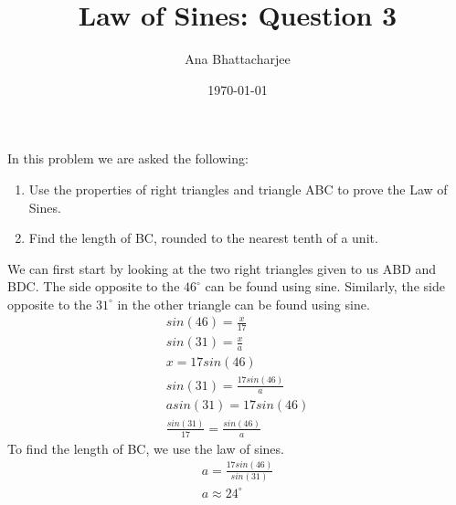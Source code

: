\documentclass{article}
\begin{document}
\author{Ana Bhattacharjee}
\title{Law of Sines: Question 3}
\date{\today}

\begin{center}
In this problem we are asked the following:
\begin{enumerate}
  \item Use the properties of right triangles and triangle ABC to prove the Law of Sines.
  \item Find the length of BC, rounded to the nearest tenth of a unit.
\end{enumerate}
\par
We can first start by looking at the two right triangles given to us ABD and BDC. The side opposite to the $46^{\circ}$ can be found using sine. Similarly, the side opposite to the $31^{\circ}$ in the other triangle can be found using sine.
\begin{align}
sin(46) = \frac{x}{17} \\
sin(31) = \frac{x}{a} \\
x = 17 sin(46) \\
sin(31) = \frac{17 sin(46)}{a} \\
a sin(31) = 17 sin(46) \\
\frac{sin(31)}{17} = \frac{sin(46)}{a}
\end{align}
To find the length of BC, we use the law of sines.
\begin{align}
  a = \frac{17 sin(46)}{sin(31)} \\
  a \approx 24^{\circ}
\end{align}
\end{center}
\end{document}
